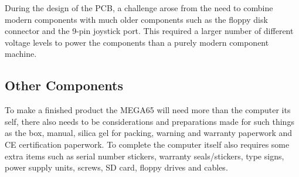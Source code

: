 During the design of the PCB, a challenge arose from the need to combine modern components with much older components such as the floppy disk connector and the 9-pin joystick port. This required a larger number of different voltage levels to power the components than a purely modern component machine. 

\subsection{Other Components}
To make a finished product the MEGA65 will need more than the computer its self, there also needs to be considerations and preparations made for such things as the box, manual, silica gel for packing, warning and warranty paperwork and CE certification paperwork. To complete the computer itself also requires some extra items such as serial number stickers, warranty seals/stickers, type signs, power supply units, screws, SD card, floppy drives and cables.